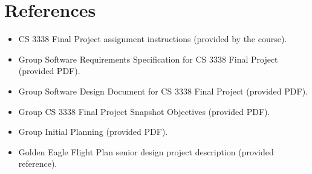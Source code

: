 \documentclass[11pt,letterpaper]{article}
\begin{document}
\section{References}
\begin{itemize}
\item CS 3338 Final Project assignment instructions (provided by the course).
\item Group Software Requirements Specification for CS 3338 Final Project (provided PDF).
\item Group Software Design Document for CS 3338 Final Project (provided PDF).
\item Group CS 3338 Final Project Snapshot Objectives (provided PDF).
\item Group Initial Planning (provided PDF).
\item Golden Eagle Flight Plan senior design project description (provided reference).
\end{itemize}
\end{document}
